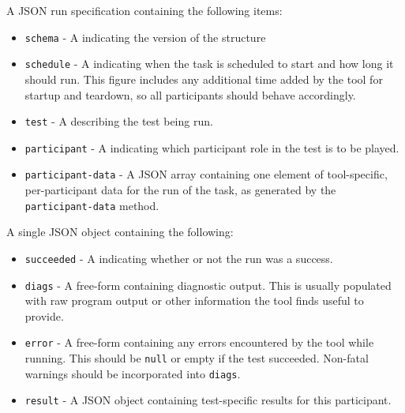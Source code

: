 \documentclass[10pt,titlepage]{article}
\begin{document}
 A JSON run specification containing the following items:
\begin{itemize}

\item{\tt schema} - A  indicating the version of the structure

\item{\tt schedule} - A  indicating when the
  task is scheduled to start and how long it should run.  This figure
  includes any additional time added by the tool for startup and
  teardown, so all participants should behave accordingly.

\item{\tt test} - A  describing the test
  being run.

\item{\tt participant} - A  indicating which
  participant role in the test is to be played.

\item{\tt participant-data} - A JSON array containing one element of
  tool-specific, per-participant data for the run of the task, as
  generated by the {\tt participant-data} method.

\end{itemize}

 A single JSON object containing the following:

\begin{itemize}
\item{\tt succeeded} - A  indicating whether or not
  the run was a success.

\item{\tt diags} - A free-form  containing diagnostic
  output.  This is usually populated with raw program output or other
  information the tool finds useful to provide.

\item{\tt error} - A free-form  containing any errors
  encountered by the tool while running.  This should be {\tt null} or
  empty if the test succeeded.  Non-fatal warnings should be
  incorporated into {\tt diags}.

\item{\tt result} - A JSON object containing test-specific results for
  this participant.

\end{itemize}
\end{document}
